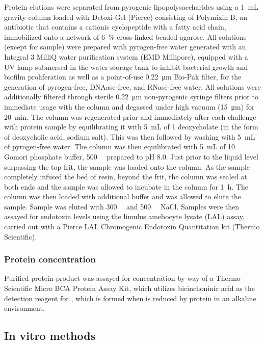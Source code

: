 \begin{refsection}
Protein elutions were separated from pyrogenic lipopolysaccharides using a
\SI{1}{\mL} gravity column loaded with Detoxi-Gel (Pierce) consisting of
Polymixin B, an antibiotic that contains a cationic cyclopeptide with a fatty
acid chain, immobilized onto a network of \SI{6}{\percent} cross-linked beaded
agarose. All solutions (except for sample) were prepared with pyrogen-free water
generated with an Integral 3 MilliQ water purification system (EMD Millipore),
equipped with a UV lamp submersed in the water storage tank to inhibit bacterial
growth and biofilm proliferation as well as a point-of-use \SI{0.22}{\um}
Bio-Pak filter, for the generation of pyrogen-free, DNAase-free, and RNase-free
water. All solutions were additionally filtered through sterile \SI{0.22}{\um}
non-pyrogenic syringe filters prior to immediate usage with the column and
degassed under high vacuum (\SI{15}{\um}) for \SI{20}{\minute}. The column was
regenerated prior and immediately after each challenge with protein sample by
equilibrating it with \SI{5}{\mL} of \SI{1}{\wtper} deoxycholate (in the form of
deoxycholic acid, sodium salt). This was then followed by washing with
\SI{5}{\mL} of pyrogen-free water. The column was then equilibrated with
\SI{5}{\mL} of \SI{10}{\milli\moLar} Gomori phosphate buffer,
\SI{500}{\milli\moLar}  prepared to pH 8.0. Just prior to the liquid
level surpassing the top frit, the sample was loaded onto the column. As the
sample completely infused the bed of resin, beyond the frit, the column was
sealed at both ends and the sample was allowed to incubate in the column for
\SI{1}{\hour}. The column was then loaded with additional buffer and was allowed
to elute the sample. Sample was eluted with \SI{300}{\milli\moLar} and
\SI{500}{\milli\moLar} NaCl. Samples were then assayed for endotoxin levels
using the limulus amebocyte lysate (LAL) assay, carried out with a Pierce LAL
Chromogenic Endotoxin Quantitation kit (Thermo Scientific).

\subsubsection{Protein concentration}
Purified protein product was assayed for concentration by way of a Thermo
Scientific Micro BCA Protein Assay Kit, which utilizes bicinchoninic acid as the
detection reagent for , which is formed when  is reduced by
protein in an alkaline environment.\cite{Smith1985}

\subsection{In vitro methods}


\end{refsection}
